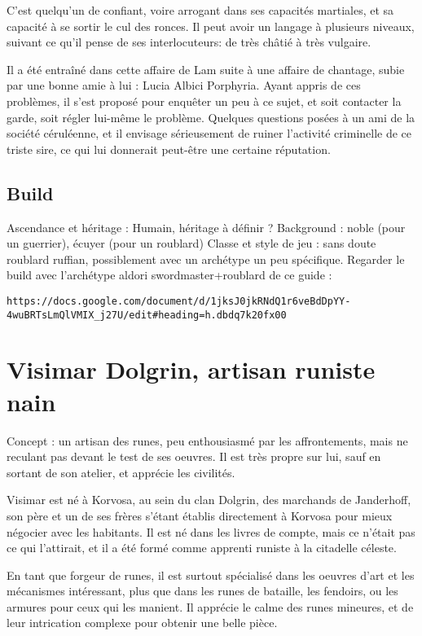 \documentclass[10pt,a4paper]{book}
\begin{document}
C'est quelqu'un de confiant, voire arrogant dans ses capacités martiales, et sa capacité à se sortir le cul des ronces. Il peut avoir un langage à plusieurs niveaux, suivant ce qu'il pense de ses interlocuteurs: de très châtié à très vulgaire.

Il a été entraîné dans cette affaire de Lam suite à une affaire de chantage, subie par une bonne amie à lui : Lucia Albici Porphyria. Ayant appris de ces problèmes, il s'est proposé pour enquêter un peu à ce sujet, et soit contacter la garde, soit régler lui-même le problème. Quelques questions posées à un ami de la société céruléenne, et il envisage sérieusement de ruiner l'activité criminelle de ce triste sire, ce qui lui donnerait peut-être une certaine réputation.

\subsection{Build}
Ascendance et héritage : Humain, héritage à définir ?
Background : noble (pour un guerrier), écuyer (pour un roublard)
Classe et style de jeu : sans doute roublard ruffian, possiblement avec un archétype un peu spécifique.  Regarder le build avec l'archétype aldori swordmaster+roublard de ce guide : \begin{verbatim}
https://docs.google.com/document/d/1jksJ0jkRNdQ1r6veBdDpYY-4wuBRTsLmQlVMIX_j27U/edit#heading=h.dbdq7k20fx00
\end{verbatim}


\section{Visimar Dolgrin, artisan runiste nain}
Concept : un artisan des runes, peu enthousiasmé par les affrontements, mais ne reculant pas devant le test de ses oeuvres. Il est très propre sur lui, sauf en sortant de son atelier, et apprécie les civilités. 

Visimar est né à Korvosa, au sein du clan Dolgrin, des marchands de Janderhoff, son père et un de ses frères s'étant établis directement à Korvosa pour mieux négocier avec les habitants. Il est né dans les livres de compte, mais ce n'était pas ce qui l'attirait, et il a été formé comme apprenti runiste à la citadelle céleste.

En tant que forgeur de runes, il est surtout spécialisé dans les oeuvres d'art et les mécanismes intéressant, plus que dans les runes de bataille, les fendoirs, ou les armures pour ceux qui les manient. Il apprécie le calme des runes mineures, et de leur intrication complexe pour obtenir une belle pièce. 
\end{document}
